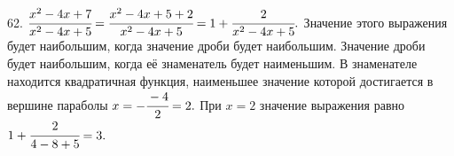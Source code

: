 62. $\cfrac{x^2-4x+7}{x^2-4x+5}=\cfrac{x^2-4x+5+2}{x^2-4x+5}=1+\cfrac{2}{x^2-4x+5}.$ Значение этого выражения будет наибольшим, когда значение дроби будет наибольшим. Значение дроби будет наибольшим, когда её знаменатель будет наименьшим. В знаменателе находится квадратичная функция, наименьшее значение которой достигается в вершине параболы $x=-\cfrac{-4}{2}=2.$ При $x=2$ значение выражения равно $1+\cfrac{2}{4-8+5}=3.$\\
